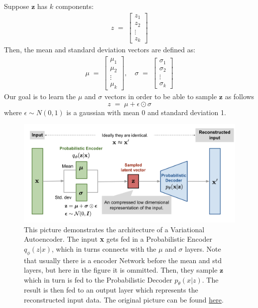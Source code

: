\documentclass[12pt]{report}
\begin{document}
Suppose $\textbf{z}$ has $k$ components:
\begin{align*}
    z \;=\;
    \begin{bmatrix}
        z_1 \\
        z_2 \\
        \vdots \\
        z_k
    \end{bmatrix}
\end{align*}
Then, the mean and standard deviation vectors are defined as:
\begin{align*}
    \mu \;=\;
    \begin{bmatrix}
        \mu_1 \\
        \mu_2 \\
        \vdots \\
        \mu_k
    \end{bmatrix}
    ,\quad \sigma \;=\;
    \begin{bmatrix}
        \sigma_1 \\
        \sigma_2 \\
        \vdots \\
        \sigma_k
    \end{bmatrix}
\end{align*}
Our goal is to learn the $\mu$ and $\sigma$ vectors in order to be able to sample
$\textbf{z}$ as follows $$z \;=\; \mu + \epsilon \odot \sigma$$
where $\epsilon \sim N(0, 1)$ is a gaussian with mean 0 and standard deviation 1.
\clearpage

\begin{figure}
    \includegraphics[scale=0.31]{vae-gaussian.png}   
    \caption{This picture demonstrates the architecture of a Variational
             Autoencoder. The input \textbf{x} gets fed in a Probabilistic
             Encoder $q_{\phi}(z | x)$, which in turns connects with the
             $\mu$ and $\sigma$ layers. Note that usually there is a encoder
             Network before the mean and std layers, but here in the figure
             it is ommitted. Then, they sample $\textbf{z}$ which
             in turn is fed to the Probabilistic Decoder $p_{\theta}(x | z)$.
             The result is then fed to an output layer which represents the
             reconstructed input data. The original picture can be found
             \href{https://blog.bayeslabs.co/2019/06/04/All-you-need-to-
             know-about-Vae.html}{here}.}
    \label{fig:Architecture}
\end{figure}
\end{document}
